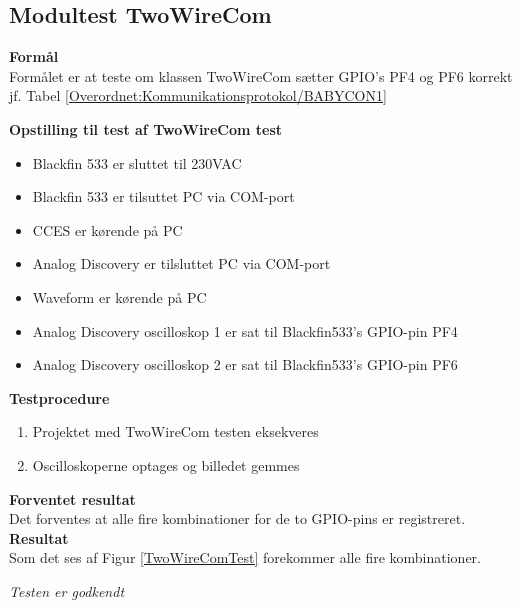 \subsection{Modultest TwoWireCom}
\textbf{Formål} \\
Formålet er at teste om klassen TwoWireCom sætter GPIO's PF4 og PF6 korrekt jf. Tabel \ref{Overordnet:Kommunikationsprotokol/BABYCON1}

\textbf{Opstilling til test af TwoWireCom test}

\begin{itemize}
	\item Blackfin 533 er sluttet til 230VAC
	\item Blackfin 533 er tilsuttet PC via COM-port
	\item CCES er kørende på PC
	\item Analog Discovery er tilsluttet PC via COM-port
	\item Waveform er kørende på PC
	\item Analog Discovery oscilloskop 1 er sat til Blackfin533's GPIO-pin PF4
	\item Analog Discovery oscilloskop 2 er sat til Blackfin533's GPIO-pin PF6
\end{itemize}

\textbf{Testprocedure}
\begin{enumerate}
	\item Projektet med TwoWireCom testen eksekveres 
	\item Oscilloskoperne optages og billedet gemmes
\end{enumerate}

\textbf{Forventet resultat} \\
Det forventes at alle fire kombinationer for de to GPIO-pins er registreret.  \\
\textbf{Resultat} \\
Som det ses af Figur \ref{TwoWireComTest} forekommer alle fire kombinationer. \\


\textit{Testen er godkendt}


